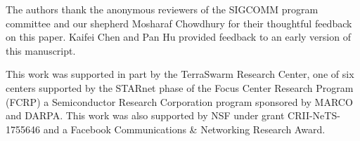\begin{acks}
  The authors thank the anonymous reviewers of the SIGCOMM program committee and
  our shepherd Mosharaf Chowdhury for their thoughtful feedback on this paper.
  Kaifei Chen and Pan Hu provided feedback to an early version of this
  manuscript.

  This work was supported in part by the TerraSwarm Research Center, one of six
  centers supported by the STARnet phase of the Focus Center Research Program
  (FCRP) a Semiconductor Research Corporation program sponsored by MARCO and
  DARPA. This work was also supported by NSF under grant CRII-NeTS-1755646 and a
  Facebook Communications \& Networking Research Award.

\end{acks}

